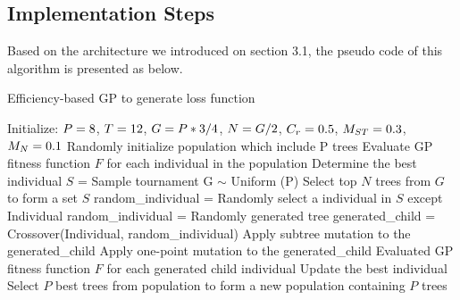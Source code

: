 \begin{ZhChapter}
\subsection{Implementation Steps}
Based on the architecture we introduced on section 3.1, the pseudo code of this algorithm is presented as below.
\begin{algorithm}
    \caption{Efficiency-based GP to generate loss function}\label{alg:cap}
    \begin{algorithmic}
        \State Initialize: \space $P = \space 8$, $T =\space 12$, $G =\space P*3/4$, $N = \space G/2$, $C_r = \space0.5$, $M_{ST} = \space0.3$, $M_N = \space0.1$
        \State Randomly initialize population which include P trees
        \State Evaluate GP fitness function $F$ for each individual in the population
        \State Determine the best individual
        \State $S$ = Sample tournament G $\sim$ Uniform (P)
        \State Select top $N$ trees from $G$ to form a set $S$
        \State random\_individual = Randomly select a individual in $S$ except Individual
        \Else
        \State random\_individual = Randomly generated tree
        \EndIf
        \State generated\_child = Crossover(Individual, random\_individual)
        \State Apply subtree mutation to the generated\_child
        \EndIf
        \State Apply one-point mutation to the generated\_child
        \EndIf
        \EndFor
        \State Evaluated GP fitness function $F$ for each generated child individual
        \State Update the best individual
        \State Select $P$ best trees from population to form a new population containing $P$ trees
        \EndWhile
    \end{algorithmic}
\end{algorithm}

\end{ZhChapter}